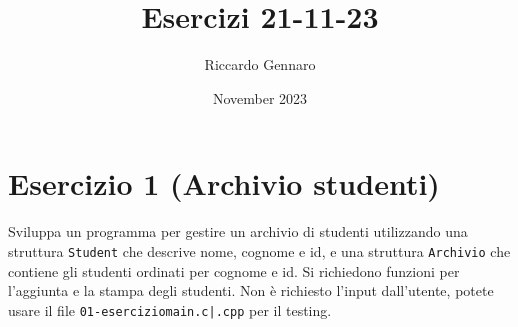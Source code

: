 \documentclass{article}
\title{Esercizi 21-11-23}
\author{Riccardo Gennaro}
\date{November 2023}
\begin{document}
    \maketitle

    \section*{Esercizio 1 (Archivio studenti)}

    
    Sviluppa un programma per gestire un archivio di studenti utilizzando una struttura \texttt{Student} che descrive nome, cognome e id, e una struttura \texttt{Archivio} che contiene gli studenti ordinati per cognome e id.
    Si richiedono funzioni per l'aggiunta e la stampa degli studenti.
    Non è richiesto l'input dall'utente, potete usare il file \texttt{01-esercizio\textunderscore main.c|.cpp} per il testing.
\end{document}
